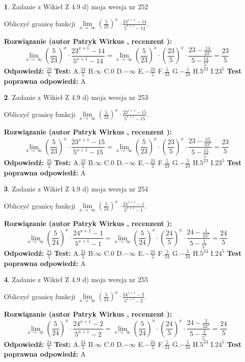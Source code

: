 \documentclass[12pt, a4paper]{article}
\theoremstyle{definition} %
\newtheorem{zad}{}
\newcommand{\zadStart}[1]{\begin{zad}#1\newline}
\newcommand{\zadStop}{\end{zad}}
\newcommand{\rozwStart}[2]{\noindent \textbf{Rozwiązanie (autor #1 , recenzent #2): }\newline}
\newcommand{\rozwStop}{\newline}
\newcommand{\odpStart}{\noindent \textbf{Odpowiedź:}\newline}
\newcommand{\odpStop}{\newline}
\newcommand{\testStart}{\noindent \textbf{Test:}\newline}
\newcommand{\testStop}{\newline}
\newcommand{\kluczStart}{\noindent \textbf{Test poprawna odpowiedź:}\newline}
\newcommand{\kluczStop}{\newline}
\begin{document}
\zadStart{Zadanie z Wikieł Z 4.9 d) moja wersja nr 252}


Obliczyć granicę funkcji  $\lim\limits_{x\to\ \infty}(\frac{5}{23})^{x}\cdot\frac{23^{x+1}-14}{5^{x+1}-14}$.
\zadStop
\rozwStart{Patryk Wirkus}{}
$$\lim\limits_{x\to\ \infty}(\frac{5}{23})^{x}\cdot\frac{23^{x+1}-14}{5^{x+1}-14}=\lim\limits_{x\to\ \infty}(\frac{5}{23})^{x}\cdot(\frac{23}{5})^{x} \cdot \frac{23-\frac{14}{23^{x}}}{5-\frac{14}{5^{x}}} = \frac{23}{5}$$
\rozwStop
\odpStart
$\frac{23}{5}$
\odpStop
\testStart
A.$\frac{23}{5}$ B.$\infty$ C.$0$ D.$-\infty$ E.$-\frac{23}{5}$
F.$\frac{5}{23}$ G.$-\frac{5}{23}$
H.$5^{23}$
I.$23^{5}$
\testStop
\kluczStart
A
\kluczStop



\zadStart{Zadanie z Wikieł Z 4.9 d) moja wersja nr 253}


Obliczyć granicę funkcji  $\lim\limits_{x\to\ \infty}(\frac{5}{23})^{x}\cdot\frac{23^{x+1}-15}{5^{x+1}-15}$.
\zadStop
\rozwStart{Patryk Wirkus}{}
$$\lim\limits_{x\to\ \infty}(\frac{5}{23})^{x}\cdot\frac{23^{x+1}-15}{5^{x+1}-15}=\lim\limits_{x\to\ \infty}(\frac{5}{23})^{x}\cdot(\frac{23}{5})^{x} \cdot \frac{23-\frac{15}{23^{x}}}{5-\frac{15}{5^{x}}} = \frac{23}{5}$$
\rozwStop
\odpStart
$\frac{23}{5}$
\odpStop
\testStart
A.$\frac{23}{5}$ B.$\infty$ C.$0$ D.$-\infty$ E.$-\frac{23}{5}$
F.$\frac{5}{23}$ G.$-\frac{5}{23}$
H.$5^{23}$
I.$23^{5}$
\testStop
\kluczStart
A
\kluczStop



\zadStart{Zadanie z Wikieł Z 4.9 d) moja wersja nr 254}


Obliczyć granicę funkcji  $\lim\limits_{x\to\ \infty}(\frac{5}{24})^{x}\cdot\frac{24^{x+1}-1}{5^{x+1}-1}$.
\zadStop
\rozwStart{Patryk Wirkus}{}
$$\lim\limits_{x\to\ \infty}(\frac{5}{24})^{x}\cdot\frac{24^{x+1}-1}{5^{x+1}-1}=\lim\limits_{x\to\ \infty}(\frac{5}{24})^{x}\cdot(\frac{24}{5})^{x} \cdot \frac{24-\frac{1}{24^{x}}}{5-\frac{1}{5^{x}}} = \frac{24}{5}$$
\rozwStop
\odpStart
$\frac{24}{5}$
\odpStop
\testStart
A.$\frac{24}{5}$ B.$\infty$ C.$0$ D.$-\infty$ E.$-\frac{24}{5}$
F.$\frac{5}{24}$ G.$-\frac{5}{24}$
H.$5^{24}$
I.$24^{5}$
\testStop
\kluczStart
A
\kluczStop



\zadStart{Zadanie z Wikieł Z 4.9 d) moja wersja nr 255}


Obliczyć granicę funkcji  $\lim\limits_{x\to\ \infty}(\frac{5}{24})^{x}\cdot\frac{24^{x+1}-2}{5^{x+1}-2}$.
\zadStop
\rozwStart{Patryk Wirkus}{}
$$\lim\limits_{x\to\ \infty}(\frac{5}{24})^{x}\cdot\frac{24^{x+1}-2}{5^{x+1}-2}=\lim\limits_{x\to\ \infty}(\frac{5}{24})^{x}\cdot(\frac{24}{5})^{x} \cdot \frac{24-\frac{2}{24^{x}}}{5-\frac{2}{5^{x}}} = \frac{24}{5}$$
\rozwStop
\odpStart
$\frac{24}{5}$
\odpStop
\testStart
A.$\frac{24}{5}$ B.$\infty$ C.$0$ D.$-\infty$ E.$-\frac{24}{5}$
F.$\frac{5}{24}$ G.$-\frac{5}{24}$
H.$5^{24}$
I.$24^{5}$
\testStop
\kluczStart
A
\kluczStop
\end{document}
